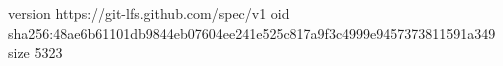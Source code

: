 version https://git-lfs.github.com/spec/v1
oid sha256:48ae6b61101db9844eb07604ee241e525c817a9f3c4999e9457373811591a349
size 5323
